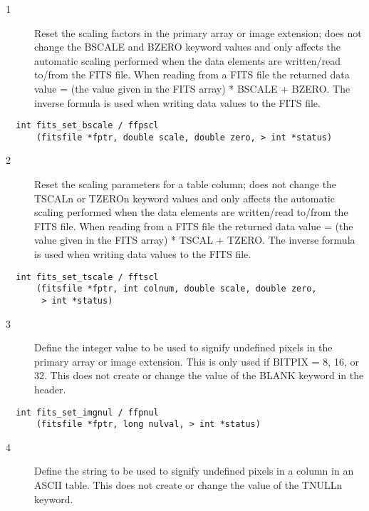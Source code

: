 \begin{description}
\item[1 ] Reset the scaling factors in the primary array or image extension; does
    not change the BSCALE and BZERO keyword values and only affects the
    automatic scaling performed when the data elements are written/read
    to/from the FITS file.   When reading from a FITS file the returned
    data value = (the value given in the FITS array) * BSCALE + BZERO.
    The inverse formula is used when writing data values to the FITS
   file.
\end{description}

\begin{verbatim}
  int fits_set_bscale / ffpscl
      (fitsfile *fptr, double scale, double zero, > int *status)
\end{verbatim}

\begin{description}
\item[2 ] Reset the scaling parameters for a table column; does not change
    the TSCALn or TZEROn keyword values and only affects the automatic
    scaling performed when the data elements are written/read to/from
    the FITS file.  When reading from a FITS file the returned data
    value = (the value given in the FITS array) * TSCAL + TZERO.  The
   inverse formula is used when writing data values to the FITS file.
\end{description}

\begin{verbatim}
  int fits_set_tscale / fftscl
      (fitsfile *fptr, int colnum, double scale, double zero,
       > int *status)
\end{verbatim}

\begin{description}
\item[3 ] Define the integer value to be used to signify undefined pixels in the
    primary array or image extension.  This is only used if BITPIX = 8, 16,
    or 32.  This does not create or change the value of the BLANK keyword in
   the header.
\end{description}

\begin{verbatim}
  int fits_set_imgnul / ffpnul
      (fitsfile *fptr, long nulval, > int *status)
\end{verbatim}

\begin{description}
\item[4 ] Define the string to be used to signify undefined pixels in
    a column in an ASCII table.  This does not create or change the value
   of the TNULLn keyword.
\end{description}

